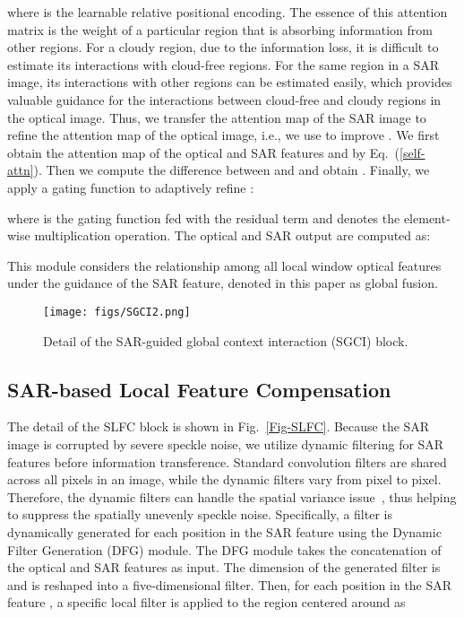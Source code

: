 \documentclass[a4paper,fleqn]{cas-dc}
\newcommand{\ie}[1]{{i.e.}}
\begin{document}
where  is the learnable relative positional encoding. The essence of this attention matrix is the weight of a particular region that is absorbing information from other regions. For a cloudy region, due to the information loss, it is difficult to estimate its interactions with cloud-free regions. For the same region in a SAR image, its interactions with other regions can be estimated easily, which provides valuable guidance for the interactions between cloud-free and cloudy regions in the optical image. Thus, 
we transfer the attention map of the SAR image to refine the attention map of the optical image,
\ie{}, 
we use  to improve . 
We first obtain the attention map of the optical and SAR features  and  by Eq.~(\ref{self-attn}).
Then we compute the difference between  and  and obtain . Finally, we apply a gating function to adaptively refine :

where  is the gating function fed with the residual term  and  denotes the  element-wise multiplication operation. The optical and SAR output are computed as:

This module considers the relationship among all local window optical features under the guidance of the SAR feature, denoted in this paper as global fusion.

\begin{figure}[!t]
	\centering
	\texttt{[image: figs/SGCI2.png]}
	\caption{Detail of the SAR-guided global context interaction (SGCI) block. }
	\label{Fig-SGCI}
	\vspace{-5mm}
\end{figure}

\subsection{SAR-based Local Feature Compensation}
\label{Sec-SLFC}
The detail of the SLFC block is shown in Fig.~\ref{Fig-SLFC}.
Because the SAR image is corrupted by severe speckle noise, we utilize dynamic filtering for SAR features before information transference.  Standard convolution filters are shared across all pixels in an image, while the dynamic filters vary
from pixel to pixel. Therefore, the dynamic filters can handle the spatial variance issue~\citep{jia2016dynamic, zhou2019spatio}, thus helping to suppress the spatially unevenly speckle noise. Specifically, 
a filter is dynamically generated for each position in the SAR feature using the Dynamic Filter Generation (DFG) module.
The DFG module takes the concatenation of the optical and SAR features  as input. The dimension of the generated filter  is  and is reshaped into a five-dimensional filter. Then, for each position
 in the SAR feature , a specific local filter
 is applied to the region centered around  as
\end{document}
